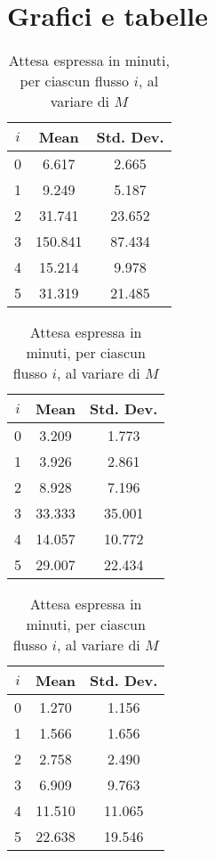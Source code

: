 \section{Grafici e tabelle}
\begin{table}[ht]
\centering
\begin{subtable}{0.33\textwidth}
\centering
{\tablecolors
\begin{tabular}{|c|c|c|}
\hline
$i$ & Mean & Std. Dev. \\
\hline
0 & 6.617 & 2.665 \\
\hline
1 & 9.249 & 5.187 \\
\hline
2 & 31.741 & 23.652 \\
\hline
3 & {\color{red}150.841} & 87.434 \\
\hline
4 & 15.214 & 9.978 \\
\hline
5 & 31.319 & 21.485 \\
\hline
\end{tabular}}
\caption{$M = 3$}
\label{table:esperimenti-simulazione-1a}
\end{subtable}%
\begin{subtable}{0.33\textwidth}
\centering
{\tablecolors
\begin{tabular}{|c|c|c|}
\hline
$i$ & Mean & Std. Dev. \\
\hline
0 & 3.209 & 1.773 \\
\hline
1 & 3.926 & 2.861 \\
\hline
2 & 8.928 & 7.196 \\
\hline
3 & 33.333 & 35.001 \\
\hline
4 & 14.057 & 10.772 \\
\hline
5 & 29.007 & 22.434 \\
\hline
\end{tabular}}
\caption{$M = 4$}
\end{subtable}%
\begin{subtable}{0.33\textwidth}
\centering
{\tablecolors
\begin{tabular}{|c|c|c|}
\hline
$i$ & Mean & Std. Dev. \\
\hline
0 & 1.270 & 1.156 \\
\hline
1 & 1.566 & 1.656 \\
\hline
2 & 2.758 & 2.490 \\
\hline
3 & 6.909 & 9.763 \\
\hline
4 & 11.510 & 11.065 \\
\hline
5 & 22.638 & 19.546 \\
\hline
\end{tabular}}
\caption{$M = 5$}
\end{subtable}
\caption{Attesa espressa in minuti, per ciascun flusso $i$, al variare di $M$}
\label{table:esperimenti-simulazione-1}
\end{table}

